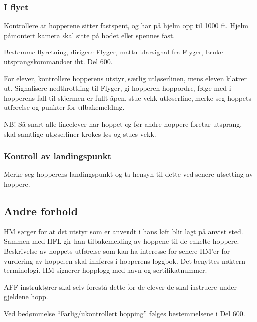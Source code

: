 \subsubsection{I flyet}
Kontrollere at hopperene sitter fastspent, og har på hjelm opp til 1000 ft. Hjelm påmontert kamera skal sitte på hodet eller spennes fast.

Bestemme flyretning, dirigere Flyger, motta klarsignal fra Flyger, bruke utsprangskommandoer iht. Del 600.

For elever, kontrollere hopperens utstyr, særlig utløserlinen, mens eleven klatrer ut. Signalisere nedthrottling til Flyger, gi hopperen hoppordre, følge med i hopperens fall til skjermen er fullt åpen, stue vekk utløserline, merke seg hoppets utførelse og punkter for tilbakemelding.

NB! Så snart alle lineelever har hoppet og før andre hoppere foretar utsprang, skal samtlige utløserliner krokes løs og stues vekk.

\subsubsection{Kontroll av landingspunkt}
Merke seg hopperens landingspunkt og ta hensyn til dette ved senere utsetting av hoppere.

\subsection{Andre forhold}
HM sørger for at det utstyr som er anvendt i hans løft blir lagt på anvist sted. Sammen med HFL gir han tilbakemelding av hoppene til de enkelte hoppere. Beskrivelse av hoppets utførelse som kan ha interesse for senere HM'er for vurdering av hopperen skal innføres i hopperens loggbok. Det benyttes nøktern terminologi. HM signerer hopplogg med navn og sertifikatnummer.

AFF-instruktører skal selv forestå dette for de elever de skal instruere under gjeldene hopp.

Ved bedømmelse ``Farlig/ukontrollert hopping'' følges bestemmelsene i Del 600.
